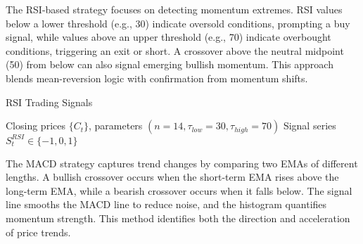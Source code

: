 The RSI-based strategy focuses on detecting momentum extremes. RSI values below a lower threshold (e.g., 30) indicate oversold conditions, prompting a buy signal, while values above an upper threshold (e.g., 70) indicate overbought conditions, triggering an exit or short. A crossover above the neutral midpoint (50) from below can also signal emerging bullish momentum. This approach blends mean-reversion logic with confirmation from momentum shifts.

\begin{breakablealgorithm}
\caption{RSI Trading Signals}
\begin{algorithmic}[1]
\Require Closing prices $\{C_t\}$, parameters $(n=14, \tau_{low}=30, \tau_{high}=70)$
\Ensure Signal series $S^{RSI}_t \in \{-1, 0, 1\}$
    \Else
    \EndIf
\EndFor
{}
\end{algorithmic}
\end{breakablealgorithm}

The MACD strategy captures trend changes by comparing two EMAs of different lengths. A bullish crossover occurs when the short-term EMA rises above the long-term EMA, while a bearish crossover occurs when it falls below. The signal line smooths the MACD line to reduce noise, and the histogram quantifies momentum strength. This method identifies both the direction and acceleration of price trends.

